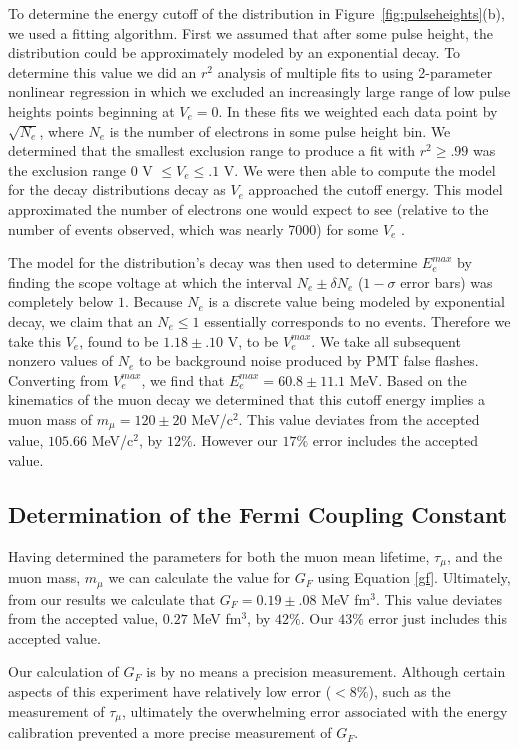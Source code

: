 To determine the energy cutoff of the distribution in Figure~\ref{fig:pulseheights}(b), we
used a fitting algorithm.  First we assumed that after some pulse
height, the distribution could be approximately modeled by an
exponential decay.  To determine this value we did an $r^{2}$ analysis
of multiple fits to using 2-parameter nonlinear regression in which we
excluded an increasingly large range of low pulse heights points
beginning at $V_{e}=0$.  In these fits we weighted each data point by
$\sqrt{N_{e}}$, where $N_{e}$ is the number of electrons in some pulse
height bin.  We determined that the smallest exclusion range to
produce a fit with $r^{2}\geq.99$ was the exclusion range $0$ V $\leq
V_{e}\leq .1$ V.  We were then able to compute the model for the
decay distributions decay as $V_{e}$ approached the cutoff energy.
This model approximated the number of electrons one would expect to
see (relative to the number of events observed, which was nearly 7000)
for some $V_{e}$ .

The model for the distribution's decay was then used to determine
$E_{e}^{max}$ by finding the scope voltage at which the interval
$N_{e}\pm \delta N_{e}$ ($1-\sigma$ error bars) was completely below
$1$.  Because $N_{e}$ is a discrete value being modeled by exponential
decay, we claim that an $N_{e} \leq 1$ essentially corresponds to no
events.  Therefore we take this $V_{e}$, found to be $1.18\pm.10$ V,
to be $V_{e}^{max}$. We take all subsequent nonzero values of $N_{e}$
to be background noise produced by PMT false flashes.  Converting from
$V_{e}^{max}$, we find that $E_{e}^{max}=60.8 \pm 11.1$ MeV.  Based on
the kinematics of the muon decay we determined that this cutoff energy
implies a muon mass of $m_{\mu} = 120 \pm 20$ MeV/c$^{2}$.  This
value deviates from the accepted value, $105.66$ MeV/c$^{2}$, by $12\%$.
However our $17\%$ error includes the accepted value.

\subsection{Determination of the Fermi Coupling Constant}\label{determinationofweakforcecouplingconstant}

Having determined the parameters for both the muon mean lifetime, $\tau_{\mu}$, and the muon mass, $m_{\mu}$ we can calculate the value for $G_{F}$ using Equation \eqref{gf}. Ultimately, from our results we calculate that $G_{F}=0.19\pm.08$ MeV fm$^{3}$.  This value deviates from the accepted value, $0.27$ MeV fm$^{3}$\cite{pdg}, by $42\%$. Our $43\%$ error just includes this accepted value.

Our calculation of $G_F$ is by no means a precision measurement.  Although certain aspects of this experiment have relatively low error ($<8\%$), such as the measurement of $\tau_{\mu}$, ultimately the overwhelming error associated with the energy calibration prevented a more precise measurement of $G_F$.
